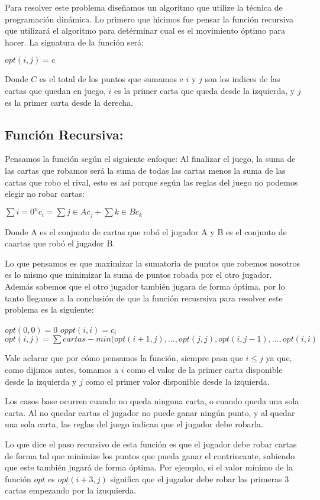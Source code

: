 Para resolver este problema diseñamos un algoritmo que utilize la técnica de programación dinámica. Lo primero que hicimos fue pensar la función recursiva que utilizará el algoritmo para detérminar cual es el movimiento óptimo para hacer. La signatura de la función será:

$opt(i,j) = c$

Donde $C$ es el total de los puntos que sumamos e $i$ y $j$ son los indices de las cartas que quedan en juego, $i$ es la primer carta que queda desde la izquierda, y $j$ es la primer carta desde la derecha.

\subsection{Función Recursiva:}

Pensamos la función según el siguiente enfoque: Al finalizar el juego, la suma de las cartas que robamos será la suma de todas las cartas menos la suma de las cartas que robo el rival, esto es así porque según las reglas del juego no podemos elegir no robar cartas:

$\sum{i=0}^{n} c_i = \sum{j \in A} c_j + \sum{k \in B} c_k$

Donde A es el conjunto de cartas que robó el jugador A y B es el conjunto de caartas que robó el jugador B.

Lo que pensamos es que maximizar la sumatoria de puntos que robemos nosotros es lo mismo que minimizar la suma de puntos robada por el otro jugador. Además sabemos que el otro jugador también jugara de forma óptima, por lo tanto llegamos a la conclusión de que la función recusrsiva para resolver este problema es la siguiente:

$opt(0,0) = 0$
$oppt(i,i) = c_i$
$opt(i,j) = \sum cartas - min(opt(i+1, j), ..., opt(j,j), opt(i, j-1), ... ,opt(i,i)$

Vale aclarar que por cómo pensamos la función, siempre pasa que $i \leq j$ ya que, como dijimos antes, tomamos a $i$ como el valor de la primer carta disponible desde la izquierda y $j$ como el primer valor disponible desde la izquierda.

Los casos base ocurren cuando no queda ninguna carta, o cuando queda una sola carta. Al no quedar cartas el jugador no puede ganar ningún punto, y al quedar una sola carta, las reglas del juego indican que el jugador debe robarla.

Lo que dice el paso recursivo de esta función es que el jugador debe robar cartas de forma tal que minimize los puntos que pueda ganar el contrincante, sabiendo que este también jugará de forma óptima. Por ejemplo, si el valor mínimo de la función $opt$ es $opt(i+3,j)$ significa que el jugador debe robar las primeras 3 cartas empezando por la izuquierda.

